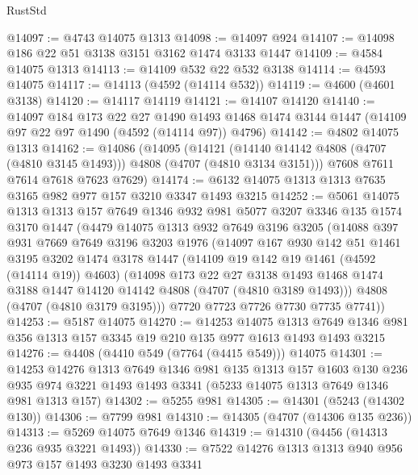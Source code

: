\begin{lexlean}{RustStd}
\begin{coremodule}
@14097 := @4743 @14075 @1313
@14098 := @14097 @924
@14107 := @14098 @186 @22 @51 @3138 @3151 @3162 @1474 @3133 @1447
@14109 := @4584 @14075 @1313
@14113 := @14109 @532 @22 @532 @3138
@14114 := @4593 @14075
@14117 := @14113 (@4592 (@14114 @532))
@14119 := @4600 (@4601 @3138)
@14120 := @14117 @14119
@14121 := @14107 @14120
@14140 := @14097
    @184
    @173
    @22
    @27
    @1490
    @1493
    @1468
    @1474
    @3144
    @1447
    (@14109 @97 @22 @97 @1490 (@4592 (@14114 @97)) @4796)
@14142 := @4802 @14075 @1313
@14162 := @14086
    (@14095
      (@14121 (@14140 @14142 @4808 (@4707 (@4810 @3145 @1493))) @4808 (@4707 (@4810 @3134 @3151)))
      @7608
      @7611
      @7614
      @7618
      @7623
      @7629)
@14174 := @6132 @14075 @1313 @1313 @7635 @3165 @982 @977 @157 @3210 @3347 @1493 @3215
@14252 := @5061
    @14075
    @1313
    @1313
    @157
    @7649
    @1346
    @932
    @981
    @5077
    @3207
    @3346
    @135
    @1574
    @3170
    @1447
    (@4479
      @14075
      @1313
      @932
      @7649
      @3196
      @3205
      (@14088
        @397
        @931
        @7669
        @7649
        @3196
        @3203
        @1976
        (@14097
          @167
          @930
          @142
          @51
          @1461
          @3195
          @3202
          @1474
          @3178
          @1447
          (@14109 @19 @142 @19 @1461 (@4592 (@14114 @19)) @4603)
          (@14098
            @173
            @22
            @27
            @3138
            @1493
            @1468
            @1474
            @3188
            @1447
            @14120
            @14142
            @4808
            (@4707 (@4810 @3189 @1493)))
          @4808
          (@4707 (@4810 @3179 @3195)))
        @7720
        @7723
        @7726
        @7730
        @7735
        @7741))
@14253 := @5187 @14075
@14270 := @14253
    @14075
    @1313
    @7649
    @1346
    @981
    @356
    @1313
    @157
    @3345
    @19
    @210
    @135
    @977
    @1613
    @1493
    @1493
    @3215
@14276 := @4408 (@4410 @549 (@7764 (@4415 @549))) @14075
@14301 := @14253
    @14276
    @1313
    @7649
    @1346
    @981
    @135
    @1313
    @157
    @1603
    @130
    @236
    @935
    @974
    @3221
    @1493
    @1493
    @3341
    (@5233 @14075 @1313 @7649 @1346 @981 @1313 @157)
@14302 := @5255 @981
@14305 := @14301 (@5243 (@14302 @130))
@14306 := @7799 @981
@14310 := @14305 (@4707 (@14306 @135 @236))
@14313 := @5269 @14075 @7649 @1346
@14319 := @14310 (@4456 (@14313 @236 @935 @3221 @1493))
@14330 := @7522 @14276 @1313 @1313 @940 @956 @973 @157 @1493 @3230 @1493 @3341

\end{coremodule}
\end{lexlean}
